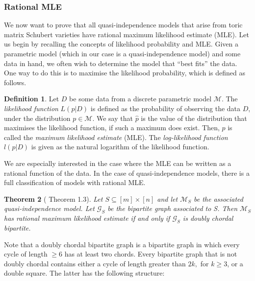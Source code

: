 \documentclass[11pt]{amsart}
\newtheorem{theorem}{Theorem}[section]
\theoremstyle{definition}
\theoremstyle{definition}
\newtheorem{definition}[theorem]{Definition}
\theoremstyle{definition}
\theoremstyle{definition}
\begin{document}
\subsubsection{Rational MLE}\noindent We now want to prove that all quasi-independence models that arise from toric matrix Schubert varieties have rational maximum likelihood estimate (MLE). Let us begin by recalling the concepts of likelihood probability and MLE. Given a parametric model (which in our case is a quasi-independence model) and some data in hand, we often wish to determine the model that ``best fits'' the data. One way to do this is to maximise the likelihood probability, which is defined as follows. 

\begin{definition}
    Let $D$ be some data from a discrete parametric model $\mathcal{M}$. The \emph{likelihood function} $L(p|D)$ is defined as the probability of observing the data $D$, under the distribution $p\in \mathcal{M}$. We say that $\hat{p}$ is the value of the distribution that maximises the likelihood function, if such a maximum does exist. Then, $\hat{p}$ is called the \emph{maximum likelihood estimate} (MLE). The \emph{log-likelihood function} $l(p|D)$ is given as the natural logarithm of the likelihood function. 
\end{definition}

\noindent We are especially interested in the case where the MLE can be written as a rational function of the data. In the case of quasi-independence models, there is 
a full classification of models with rational MLE. 

\begin{theorem}[\cite{coons2021quasi} Theorem 1.3]\label{thm: rat mle}
Let $S \subseteq [m] \times [n]$ and let $\mathcal{M}_S$ be the associated quasi-independence model. Let $\mathcal{G}_S$ be the bipartite graph associated to S. Then $\mathcal{M}_S$ has rational maximum likelihood estimate if and only if $\mathcal{G}_S$ is doubly chordal bipartite.
\end{theorem}
\noindent Note that a doubly chordal bipartite graph is a bipartite graph in which every cycle of length $\geq 6$ has at least two chords. Every bipartite graph that is not doubly chordal contains either a cycle of length greater than $2k,$ for $k\geq 3$, or a double square. The latter has the following structure:
\begin{center}
\end{center}
\end{document}
